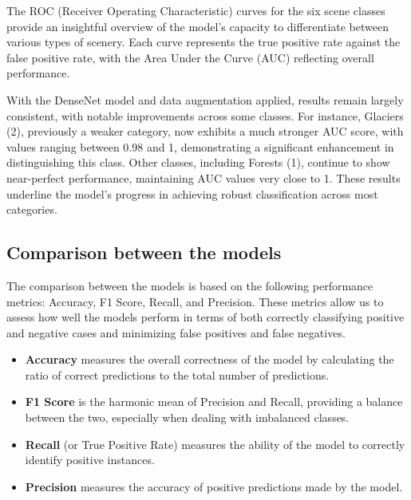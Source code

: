 The ROC (Receiver Operating Characteristic) curves for the six scene classes provide an insightful overview of the model’s capacity to differentiate between various types of scenery. Each curve represents the true positive rate against the false positive rate, with the Area Under the Curve (AUC) reflecting overall performance.

With the DenseNet model and data augmentation applied, results remain largely consistent, with notable improvements across some classes. For instance, Glaciers (2), previously a weaker category, now exhibits a much stronger AUC score, with values ranging between 0.98 and 1, demonstrating a significant enhancement in distinguishing this class. Other classes, including Forests (1), continue to show near-perfect performance, maintaining AUC values very close to 1. These results underline the model’s progress in achieving robust classification across most categories.



























\subsection{Comparison between the models}

The comparison between the models is based on the following performance metrics: Accuracy, F1 Score, Recall, and Precision. These metrics allow us to assess how well the models perform in terms of both correctly classifying positive and negative cases and minimizing false positives and false negatives.

\begin{itemize}
    \item \textbf{Accuracy} measures the overall correctness of the model by calculating the ratio of correct predictions to the total number of predictions.
    \item \textbf{F1 Score} is the harmonic mean of Precision and Recall, providing a balance between the two, especially when dealing with imbalanced classes.
    \item \textbf{Recall} (or True Positive Rate) measures the ability of the model to correctly identify positive instances.
    \item \textbf{Precision} measures the accuracy of positive predictions made by the model.
\end{itemize}

